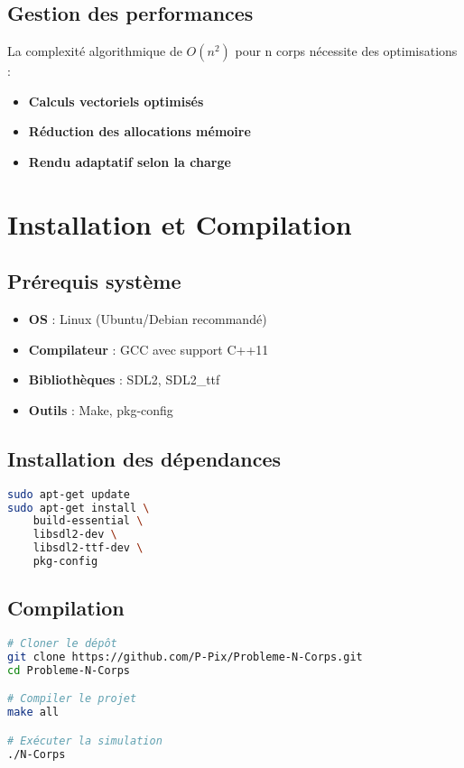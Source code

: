 \documentclass[12pt,a4paper]{article}
\begin{document}
\subsection{Gestion des performances}

La complexité algorithmique de $O(n^2)$ pour n corps nécessite des optimisations :

\begin{itemize}
    \item \textbf{Calculs vectoriels optimisés}
    \item \textbf{Réduction des allocations mémoire}
    \item \textbf{Rendu adaptatif selon la charge}
\end{itemize}

\section{Installation et Compilation}

\subsection{Prérequis système}

\begin{itemize}
    \item \textbf{OS} : Linux (Ubuntu/Debian recommandé)
    \item \textbf{Compilateur} : GCC avec support C++11
    \item \textbf{Bibliothèques} : SDL2, SDL2\_ttf
    \item \textbf{Outils} : Make, pkg-config
\end{itemize}

\subsection{Installation des dépendances}

\begin{lstlisting}[language=bash, caption=Installation Ubuntu/Debian]
sudo apt-get update
sudo apt-get install \
    build-essential \
    libsdl2-dev \
    libsdl2-ttf-dev \
    pkg-config
\end{lstlisting}

\subsection{Compilation}

\begin{lstlisting}[language=bash, caption=Processus de compilation]
# Cloner le dépôt
git clone https://github.com/P-Pix/Probleme-N-Corps.git
cd Probleme-N-Corps

# Compiler le projet
make all

# Exécuter la simulation
./N-Corps
\end{lstlisting}
\end{document}
